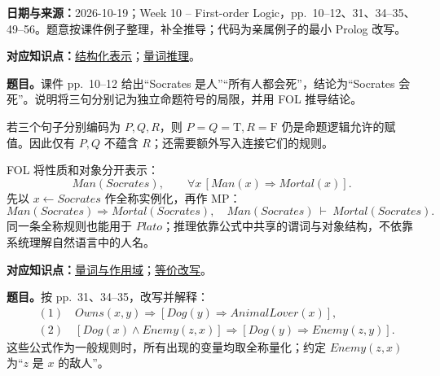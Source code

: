 \begingroup
\renewcommand{\recordid}[1]{}
\renewcommand{\relatedtopic}[2]{\hyperref[topic:#1]{#2}}


\textbf{日期与来源：}2026-10-19；Week 10 -- First-order Logic，pp.~10--12、31、34--35、49--56。题意按课件例子整理，补全推导；代码为亲属例子的最小 Prolog 改写。


\textbf{对应知识点：}\relatedtopic{SC3000-L09-T01}{结构化表示}；\relatedtopic{SC3000-L09-T05}{量词推理}。

\textbf{题目。}课件 pp.~10--12 给出“Socrates 是人”“所有人都会死”，结论为“Socrates 会死”。说明将三句分别记为独立命题符号的局限，并用 FOL 推导结论。

\begin{workedsolution}
若三个句子分别编码为 $P,Q,R$，则 $P=Q=\mathrm T,R=\mathrm F$ 仍是命题逻辑允许的赋值。因此仅有 $P,Q$ 不蕴含 $R$；还需要额外写入连接它们的规则。

FOL 将性质和对象分开表示：
\[
 Man(Socrates),\qquad
 \forall x\,[Man(x)\Rightarrow Mortal(x)].
\]
先以 $x\leftarrow Socrates$ 作全称实例化，再作 MP：
\[
 Man(Socrates)\Rightarrow Mortal(Socrates),\quad
 Man(Socrates)\ \vdash\ \boxed{Mortal(Socrates)}.
\]
同一条全称规则也能用于 $Plato$；推理依靠公式中共享的谓词与对象结构，不依靠系统理解自然语言中的人名。
\end{workedsolution}


\textbf{对应知识点：}\relatedtopic{SC3000-L09-T02}{量词与作用域}；\relatedtopic{SC3000-L09-T03}{等价改写}。

\textbf{题目。}按 pp.~31、34--35，改写并解释：
\begin{align*}
 &(1)\quad Owns(x,y)\Rightarrow[Dog(y)\Rightarrow AnimalLover(x)],\\
 &(2)\quad [Dog(x)\land Enemy(z,x)]\Rightarrow[Dog(y)\Rightarrow Enemy(z,y)].
\end{align*}
这些公式作为一般规则时，所有出现的变量均取全称量化；约定 $Enemy(z,x)$ 为“$z$ 是 $x$ 的敌人”。

